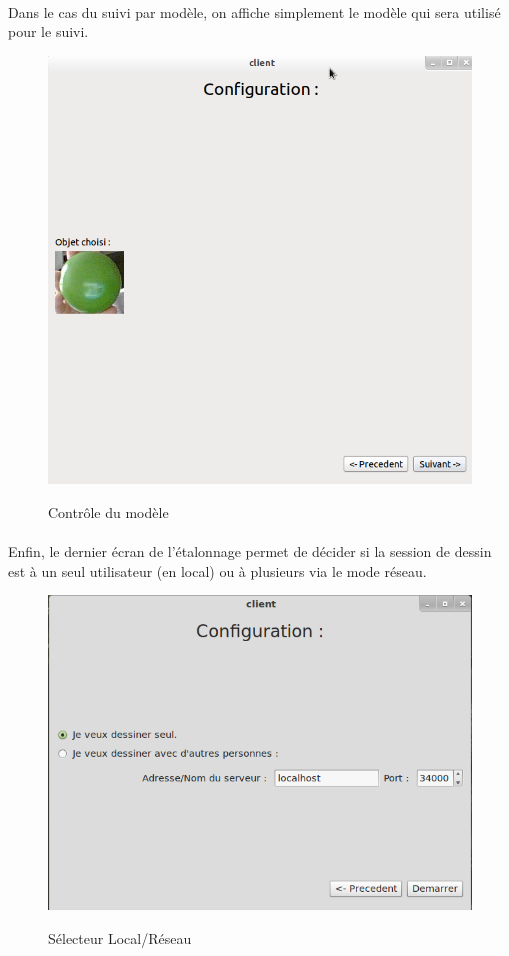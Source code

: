 \documentclass{report}
\begin{document}
				\paragraph{}
				Dans le cas du suivi par modèle, on affiche simplement le modèle qui sera utilisé pour le suivi.
				\begin{figure}[!h]
						\centering
						\includegraphics[scale=0.35]{../images/Capture7.png}\\
						\caption{Contrôle du modèle}
						\label{Contrôle du modèle}
				\end{figure}
				\newpage
				\paragraph{}
				Enfin, le dernier écran de l'étalonnage permet de décider si la session de dessin est à un seul utilisateur (en local) ou à plusieurs via le mode réseau.
				\begin{figure}[!h]
						\centering
						\includegraphics[scale=0.4]{../images/capture_choix.png}\\
						\caption{Sélecteur Local/Réseau}
						\label{Sélecteur Local/Réseau}
				\end{figure}
\end{document}
